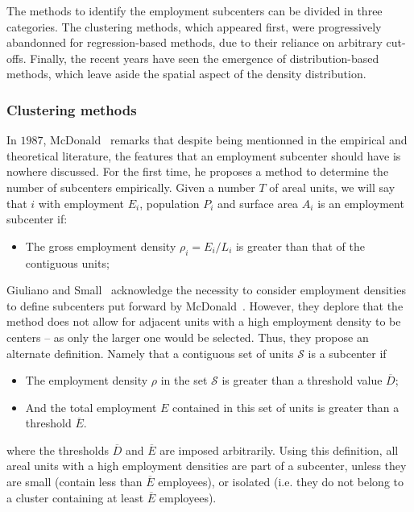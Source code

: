 The methods to identify the employment subcenters can be divided in
three categories. The clustering methods, which appeared first, were
progressively abandonned for regression-based methods, due to their reliance on
arbitrary cut-offs. Finally, the recent years have seen the emergence of
distribution-based methods, which leave aside the spatial aspect of the density
distribution.


\subsubsection{Clustering methods}
\label{ssub:clustering_methods}


In $1987$, McDonald~\cite{McDonald:1987} remarks that despite being mentionned
in the empirical and theoretical literature, the features that an employment
subcenter should have is nowhere discussed. For the first time, he proposes a method to
determine the number of subcenters empirically. Given
a number $T$ of areal units, we will say that $i$ with employment $E_i$,
population $P_i$ and surface area $A_i$ is an employment subcenter if:

\begin{itemize}
    \item The gross employment density $\rho_i = E_i/L_i$ is greater than that
        of the contiguous units;
\end{itemize}

Giuliano and Small~\cite{Giuliano:1991} acknowledge the necessity to
consider employment densities to define subcenters put forward by
McDonald~\cite{McDonald:1987}. However, they deplore that the method does not
allow for adjacent units with a high employment density to be centers -- as only
the larger one would be selected. Thus, they propose an alternate definition.
Namely that a contiguous set of units $\mathcal{S}$ is a subcenter if 

\begin{itemize}
    \item The employment density $\rho$ in the set $\mathcal{S}$ is greater than
        a threshold value  $\overline{D}$;
    \item And the total employment $E$ contained in this set of units is greater than a threshold
        $\overline{E}$.
\end{itemize}

where the thresholds $\overline{D}$ and $\overline{E}$ are imposed arbitrarily.
Using this definition, all areal units with a high employment densities are part
of a subcenter, unless they are small (contain less than $\overline{E}$
employees), or isolated (i.e. they do not belong to a cluster containing at
least $\overline{E}$ employees).


